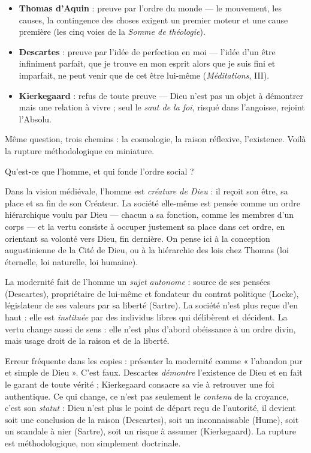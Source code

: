 \documentclass[11pt]{article}
\newcounter{popsec}
\newcounter{popsub}
\newcommand{\courssub}[1]{%
  \stepcounter{popsub}%
  \par\vspace{9pt}\noindent{\popxbold\fontsize{11.5}{13}\selectfont\color{popink}{\color{poporange}\thepopsec.\thepopsub}\hspace{6pt}#1}\par\nopagebreak\vspace{4pt}
}
\begin{document}
\begin{exemplebox}
\begin{itemize}
\item \textbf{Thomas d'Aquin} : preuve par l'ordre du monde — le mouvement, les causes, la contingence des choses exigent un premier moteur et une cause première (les cinq voies de la \emph{Somme de théologie}).
\item \textbf{Descartes} : preuve par l'idée de perfection en moi — l'idée d'un être infiniment parfait, que je trouve en mon esprit alors que je suis fini et imparfait, ne peut venir que de cet être lui-même (\emph{Méditations}, III).
\item \textbf{Kierkegaard} : refus de toute preuve — Dieu n'est pas un objet à démontrer mais une relation à vivre ; seul le \emph{saut de la foi}, risqué dans l'angoisse, rejoint l'Absolu.
\end{itemize}
Même question, trois chemins : la cosmologie, la raison réflexive, l'existence. Voilà la rupture méthodologique en miniature.
\end{exemplebox}

\courssub{Cinquième critère : l'homme et la société}

Qu'est-ce que l'homme, et qui fonde l'ordre social ?

Dans la vision médiévale, l'homme est \emph{créature de Dieu} : il reçoit son être, sa place et sa fin de son Créateur. La société elle-même est pensée comme un ordre hiérarchique voulu par Dieu — chacun a sa fonction, comme les membres d'un corps — et la vertu consiste à occuper justement sa place dans cet ordre, en orientant sa volonté vers Dieu, fin dernière. On pense ici à la conception augustinienne de la Cité de Dieu, ou à la hiérarchie des lois chez Thomas (loi éternelle, loi naturelle, loi humaine).

La modernité fait de l'homme un \emph{sujet autonome} : source de ses pensées (Descartes), propriétaire de lui-même et fondateur du contrat politique (Locke), législateur de ses valeurs par sa liberté (Sartre). La société n'est plus reçue d'en haut : elle est \emph{instituée} par des individus libres qui délibèrent et décident. La vertu change aussi de sens : elle n'est plus d'abord obéissance à un ordre divin, mais usage droit de la raison et de la liberté.

\begin{attention}
Erreur fréquente dans les copies : présenter la modernité comme « l'abandon pur et simple de Dieu ». C'est faux. Descartes \emph{démontre} l'existence de Dieu et en fait le garant de toute vérité ; Kierkegaard consacre sa vie à retrouver une foi authentique. Ce qui change, ce n'est pas seulement le \emph{contenu} de la croyance, c'est son \emph{statut} : Dieu n'est plus le point de départ reçu de l'autorité, il devient soit une conclusion de la raison (Descartes), soit un inconnaissable (Hume), soit un scandale à nier (Sartre), soit un risque à assumer (Kierkegaard). La rupture est méthodologique, non simplement doctrinale.
\end{attention}
\end{document}
